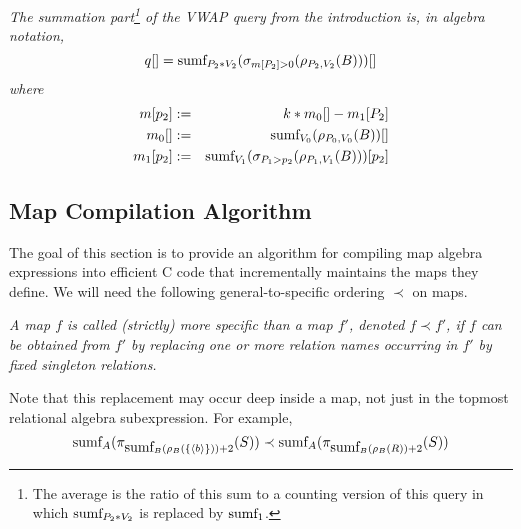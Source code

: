 \begin{example}\em
\label{ex:compiler1}
The summation part\footnote{The average is the ratio
of this sum to a
counting version of this query in which $\mbox{sumf}_{P_2 * V_2}$ is replaced by
$\mbox{sumf}_1$.}
 of the VWAP query from the introduction is, in algebra notation,
\begin{equation}
q[] = \mbox{sumf}_{P_2 * V_2}(
\sigma_{m[P_2] > 0}(\rho_{P_2, V_2}(B)))[]
\end{equation}
where
\begin{eqnarray*}
m[p_2] &:=& k * m_0[] - m_1[P_2]
\\
m_0[] &:=&
\mbox{sumf}_{V_0}(\rho_{P_0, V_0}(B))[]
\\
m_1[p_2] &:=&
\mbox{sumf}_{V_1}(\sigma_{P_1 > p_2}(\rho_{P_1, V_1}(B)))[p_2]
\end{eqnarray*}
\end{example}



\subsection{Map Compilation Algorithm}


The goal of this section is to provide an algorithm for compiling map algebra
expressions into efficient C code that incrementally maintains the
maps they define.
We will need the following general-to-specific ordering $\prec$ on maps.


\begin{definition}\em
A map $f$ is called (strictly) {\em more specific than}\/ a map $f'$,
denoted $f \prec f'$, if $f$ can be obtained from $f'$ by replacing
one or more relation names occurring in $f'$ by fixed singleton relations.
\end{definition}


Note that this replacement may occur deep inside a map, not just in the topmost
relational algebra subexpression. For example,
\[
\mbox{sumf}_A(\pi_{\mbox{sumf}_B(\rho_B(\{{\langle b\rangle}\})) + 2}(S))
\prec
\mbox{sumf}_A(\pi_{\mbox{sumf}_B(\rho_B(R)) + 2}(S))
\]




